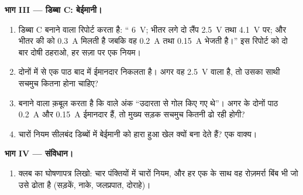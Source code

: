 \begin{problem}[{सप्ताहांत समस्या --- इलेक्ट्रॉनिकी क्लब की सीलबंद
डिब्बों वाली चुनौती; चार नियम बनाम चार पहेलियाँ; महान
लेखा}]
\medskip\noindent\textbf{भाग III --- डिब्बा C: बेईमानी।}
\begin{enumerate}[resume]
  \item डिब्बा C बनाने वाला रिपोर्ट करता है: `` \qty{6}{V};
        भीतर  लगे दो लैंप \qty{2.5}{V} तथा \qty{4.1}{V} पर;
        और भीतर की  को \qty{0.3}{A} मिलती है जबकि वह \qty{0.2}{A}
        तथा \qty{0.15}{A} भेजती है।'' इस रिपोर्ट को दो बार दोषी
        ठहराओ, हर सज़ा पर एक नियम।
  \item दोनों में से एक  पाठ बाद में ईमानदार निकलता है। अगर
        वह \qty{2.5}{V} वाला है, तो उसका साथी सचमुच कितना होना
        चाहिए?
  \item बनाने वाला क़बूल करता है कि  वाले अंक ``उदारता से गोल
        किए गए थे''। अगर  के दोनों पाठ \qty{0.2}{A} और
        \qty{0.15}{A} ईमानदार हैं, तो मुख्य सड़क सचमुच कितनी ढो रही
        होगी?
  \item चारों नियम सीलबंद डिब्बों में बेईमानी को हारा हुआ खेल क्यों
        बना देते हैं? एक वाक्य।
\end{enumerate}

\medskip\noindent\textbf{भाग IV --- संविधान।}
\begin{enumerate}[resume]
  \item क्लब का घोषणापत्र लिखो: चार पंक्तियों में चारों नियम, और हर
        एक के साथ वह रोज़मर्रा बिंब भी जो उसे ढोता है (सड़कें, नाके,
        जलप्रपात, दोराहे)।
\end{enumerate}
\end{problem}
